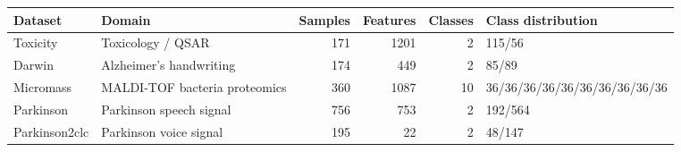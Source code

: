 \begin{tabular}{llrrrl}
\toprule
Dataset & Domain & Samples & Features & Classes & Class distribution \\
\midrule
Toxicity & Toxicology / QSAR & 171 & 1201 & 2 & 115/56 \\
Darwin & Alzheimer's handwriting & 174 & 449 & 2 & 85/89 \\
Micromass & MALDI-TOF bacteria proteomics & 360 & 1087 & 10 & 36/36/36/36/36/36/36/36/36/36 \\
Parkinson & Parkinson speech signal & 756 & 753 & 2 & 192/564 \\
Parkinson2clc & Parkinson voice signal & 195 & 22 & 2 & 48/147 \\
\bottomrule
\end{tabular}
